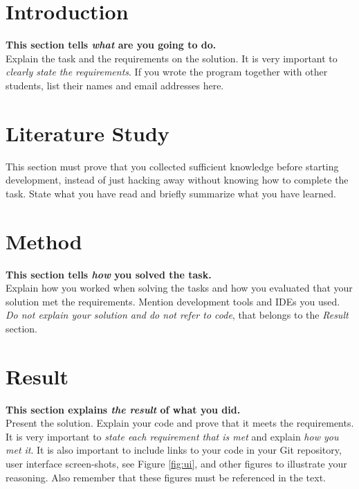 \documentclass[a4paper]{scrartcl}
\begin{document}
\section{Introduction}

\textbf{This section tells \textit{what} are you going to do.} \\

\noindent Explain the task and the requirements on the solution. It is very important to \textit{clearly state the requirements}. If you wrote the program together with other students, list their names and email addresses here.

\section{Literature Study}

This section must prove that you collected sufficient knowledge before starting development, instead of just hacking away without knowing how to complete the task. State what you have read and briefly summarize what you have learned.

\section{Method}

\textbf{This section tells \textit{how} you solved the task.} \\

\noindent Explain how you worked when solving the tasks and how you evaluated that your solution met the requirements. Mention development tools and IDEs you used. \textit{Do not explain your solution and do not refer to code}, that belongs to the \textit{Result} section.

\section{Result}

\textbf{This section explains \textit{the result} of what you did.} \\

\noindent Present the solution. Explain your code and prove that it meets the requirements. It is very important to \textit{state each requirement that is met} and explain \textit{how you met it}. It is also important to include links to your code in your Git repository, user interface screen-shots, see Figure \ref{fig:ui}, and other figures to illustrate your reasoning. Also remember that these figures must be referenced in the text.
\end{document}

